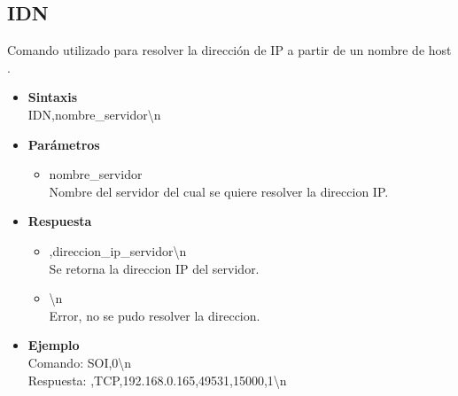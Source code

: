\documentclass[a4paper,spanish]{article}
\begin{document}
\subsection{IDN}
Comando utilizado para resolver la dirección de IP a partir de un nombre de host .
\begin{itemize}
	\item \textbf{Sintaxis}\\
	{\ttfamily IDN,nombre\_servidor\textbackslash n}
	\item \textbf{Parámetros}
	\begin{itemize}
		\item{\ttfamily nombre\_servidor}\\
		Nombre del servidor del cual se quiere resolver la direccion IP.
	\end{itemize}
	\item \textbf{Respuesta}
	\begin{itemize}
		\item{,direccion\_ip\_servidor\textbackslash n} \\
		Se retorna la direccion IP del servidor. 
		\item{\textbackslash n} \\
		Error, no se pudo resolver la direccion.
	\end{itemize} 
	\item \textbf{Ejemplo}\\
	Comando: {\ttfamily SOI,0\textbackslash n}\\
	Respuesta: {,TCP,192.168.0.165,49531,15000,1\textbackslash n}
\end{itemize}
\end{document}
